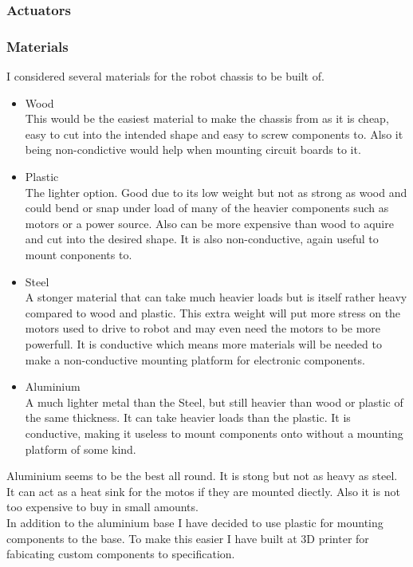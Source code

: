 \documentclass[11pt,fleqn,twoside]{article}
\begin{document}
\subsubsection{Actuators}

\subsubsection{Materials}
I considered several materials for the robot chassis to be built of.
\begin{itemize}
\item Wood
\\This would be the easiest material to make the chassis from as it is cheap, easy to cut into the intended shape and easy to screw components to.  Also it being non-condictive would help when mounting circuit boards to it.
\item Plastic
\\The lighter option.  Good due to its low weight but not as strong as wood and could bend or snap under load of many of the heavier components such as motors or a power source.  Also can be more expensive than wood to aquire and cut into the desired shape.  It is also non-conductive, again useful to mount conponents to.
\item Steel
\\A stonger material that can take much heavier loads but is itself rather heavy compared to wood and plastic.  This extra weight will put more stress on the motors used to drive to robot and may even need the motors to be more powerfull.  It is conductive which means more materials will be needed to make a non-conductive mounting platform for electronic components.
\item Aluminium
\\A much lighter metal than the Steel, but still heavier than wood or plastic of the same thickness.  It can take heavier loads than the plastic. It is conductive, making it useless to mount components onto without a mounting platform of some kind.
\end{itemize}
Aluminium seems to be the best all round.  It is stong but not as heavy as steel.  It can act as a heat sink for the motos if they are mounted diectly.  Also it is not too expensive to buy in small amounts.
\\In addition to the aluminium base I have decided to use plastic for mounting components to the base.  To make this easier I have built at 3D printer for fabicating custom components to specification.
\end{document}
